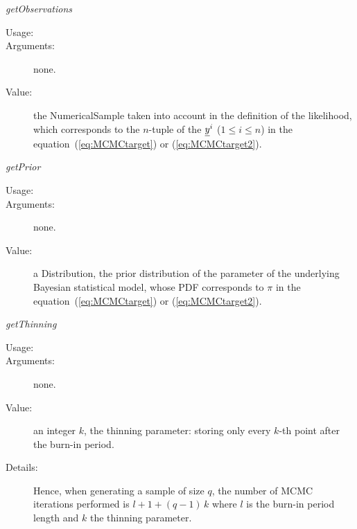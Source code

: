 \begin{description}
\begin{description}
\item \textit{getObservations}
\begin{description}
\item[Usage:] \rule{0pt}{1em}
\item[Arguments:] none. \rule{0pt}{1em}
\item[Value:] the NumericalSample taken into account in the definition of
the likelihood, which corresponds to the $n$-tuple of the ${\underline{y}}^i$
($1\leq{}i\leq{}n$) in the equation~(\ref{eq:MCMCtarget}) or
(\ref{eq:MCMCtarget2}).
\end{description}
\bigskip

\item \textit{getPrior}
\begin{description}
\item[Usage:] \rule{0pt}{1em}
\item[Arguments:] none. \rule{0pt}{1em}
\item[Value:] a Distribution, the prior distribution of the parameter of the
underlying Bayesian statistical model, whose PDF corresponds to $\pi$
in the equation~(\ref{eq:MCMCtarget}) or (\ref{eq:MCMCtarget2}).
\end{description}
\bigskip

\item \textit{getThinning}
\begin{description}
\item[Usage:] \rule{0pt}{1em}
\item[Arguments:] none. \rule{0pt}{1em}
\item[Value:] an integer $k$, the thinning parameter: storing only every
$k$-th point after the burn-in period.
\item[Details:] Hence, when generating a sample of size $q$,
the number of MCMC iterations performed is $l + 1 + (q - 1) \, k$
where $l$ is the burn-in period length and $k$ the thinning parameter.
\end{description}

\end{description}

\end{description}


